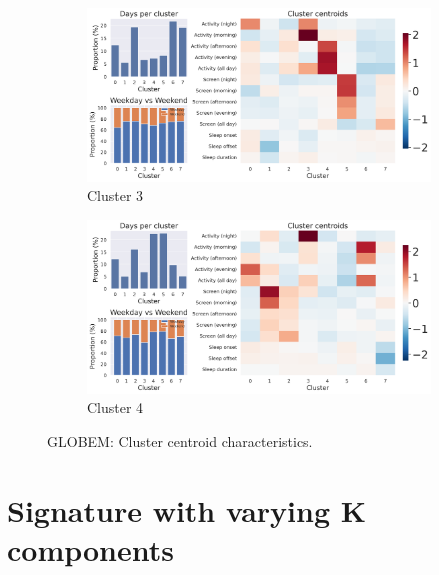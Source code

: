 \begin{appendices}
\begin{figure}[p]
  \begin{subfigure}[t]{0.485\textwidth}
    \centering
    \includegraphics[width=\linewidth]{figures/appendix/globem_INS-W_3_summary.png}
    \caption{Cluster 3}
    \label{fig:globem_centroids_c}
  \end{subfigure}\hfill
  \begin{subfigure}[t]{0.485\textwidth}
    \centering
    \includegraphics[width=\linewidth]{figures/appendix/globem_INS-W_4_summary.png}
    \caption{Cluster 4}
    \label{fig:globem_centroids_d}
  \end{subfigure}

  \caption{GLOBEM: Cluster centroid characteristics.}
  \label{fig:globem_centroids}
\end{figure}


\clearpage
\section{Signature with varying K components}



\end{appendices}
